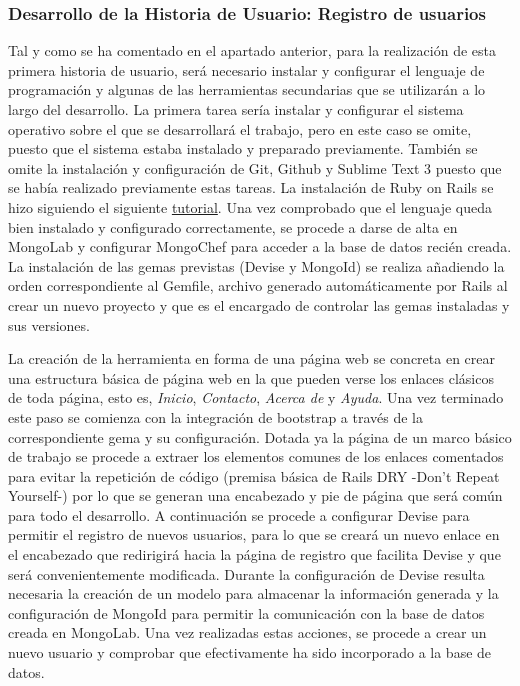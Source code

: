 	\subsubsection{Desarrollo de la Historia de Usuario: Registro de usuarios }
	Tal y como se ha comentado en el apartado anterior, para la realización de esta primera historia de usuario, será necesario instalar y configurar el lenguaje de programación y algunas de las herramientas secundarias que se utilizarán a lo largo del desarrollo.
	La primera tarea sería instalar y configurar el sistema operativo sobre el que se desarrollará el trabajo, pero en este caso se omite, puesto que el sistema estaba instalado y preparado previamente. También se omite la instalación y configuración de Git, Github y Sublime Text 3 puesto que se había realizado previamente estas tareas.
	La instalación de Ruby on Rails se hizo siguiendo el siguiente \href{http://railsapps.github.io/installrubyonrails-ubuntu.html}{tutorial}.
	Una vez comprobado que el lenguaje queda bien instalado y configurado correctamente, se procede a darse de alta en MongoLab y configurar MongoChef para acceder a la base de datos recién creada.
	La instalación de las gemas previstas (Devise y MongoId) se realiza añadiendo la orden correspondiente al Gemfile, archivo generado automáticamente por Rails al crear un nuevo proyecto y que es el encargado de controlar las gemas instaladas y sus versiones.
	
	La creación de la herramienta en forma de una página web se concreta en crear una estructura básica de página web en la que pueden verse los enlaces clásicos de toda página, esto es, \textit{Inicio}, \textit{Contacto}, \textit{Acerca de} y \textit{Ayuda}.
	Una vez terminado este paso se comienza con la integración de bootstrap a través de la correspondiente gema y su configuración. Dotada ya la página de un marco básico de trabajo se procede a extraer los elementos comunes de los enlaces comentados para evitar la repetición de código (premisa básica de Rails DRY -Don't Repeat Yourself-) por lo que se generan una encabezado y pie de página que será común para todo el desarrollo.
	A continuación se procede a configurar Devise para permitir el registro de nuevos usuarios, para lo que se creará un nuevo enlace en el encabezado que redirigirá hacia la página de registro que facilita Devise y que será convenientemente modificada.
	Durante la configuración de Devise resulta necesaria la creación de un modelo para almacenar la información generada y la configuración de MongoId para permitir la comunicación con la base de datos creada en MongoLab.
	Una vez realizadas estas acciones, se procede a crear un nuevo usuario y comprobar que efectivamente ha sido incorporado a la base de datos.
	
